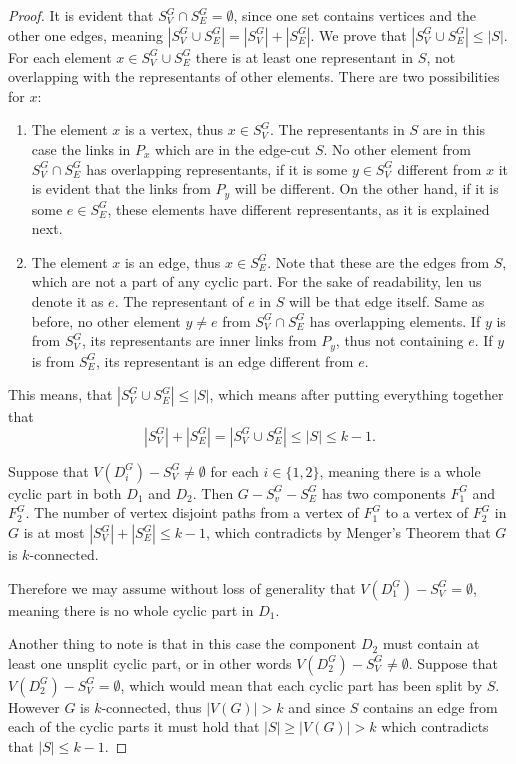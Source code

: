 \documentclass[12pt, twoside]{book}
\begin{document}
\begin{proof}
	It is evident that $S_V^G\cap S_E^G=\emptyset$, since one set contains vertices and the other one edges, meaning $|S_V^G\cup S_E^G|=|S_V^G|+|S_E^G|$. We prove that $|S_V^G\cup S_E^G|\leq |S|$. For each element $x\in S_V^G\cup S_E^G$ there is at least one representant in $S$, not overlapping with the representants of other elements. There are two possibilities for $x$:
	\begin{enumerate}
		\item The element $x$ is a vertex, thus $x\in S_V^G$. The representants in $S$ are in this case the links in $P_x$ which are in the edge-cut $S$. No other element from $S_V^G\cap S_E^G$ has overlapping representants, if it is some $y\in S_V^G$ different from $x$ it is evident that the links from $P_y$ will be different. On the other hand, if it is some $e\in S_E^G$, these elements have different representants, as it is explained next.
		\item The element $x$ is an edge, thus $x\in S_E^G$. Note that these are the edges from $S$, which are not a part of any cyclic part. For the sake of readability, len us denote it as $e$. The representant of $e$ in $S$ will be that edge itself. Same as before, no other element $y\neq e$ from $S_V^G\cap S_E^G$ has overlapping elements. If $y$ is from $S_V^G$, its representants are inner links from $P_y$, thus not containing $e$. If $y$ is from $S_E^G$, its representant is an edge different from $e$.
	\end{enumerate} 
	
	This means, that $|S_V^G\cup S_E^G|\leq |S|$, which means after putting everything together that $$|S_V^G|+|S_E^G|=|S_V^G\cup S_E^G|\leq |S|\leq k-1.$$
	
	Suppose that $V(D_i^G)-S_V^G\neq\emptyset$ for each $i\in \{1,2\}$, meaning there is a whole cyclic part in both $D_1$ and $D_2$. Then $G-S_v^G-S_E^G$ has two components $F_1^G$ and $F_2^G$. The number of vertex disjoint paths from a vertex of $F_1^G$ to a vertex of $F_2^G$ in $G$ is at most $|S_V^G|+|S_E^G|\leq k-1$, which contradicts by Menger's Theorem that $G$ is $k$-connected.
	
	Therefore we may assume without loss of generality that $V(D_1^G)-S_V^G=\emptyset$, meaning there is no whole cyclic part in $D_1$.
	
	Another thing to note is that in this case the component $D_2$ must contain at least one unsplit cyclic part, or in other words $V(D_2^G)-S_V^G\neq\emptyset$. Suppose that $V(D_2^G)-S_V^G=\emptyset$, which would mean that each cyclic part has been split by $S$. However $G$ is $k$-connected, thus $|V(G)|>k$ and since $S$ contains an edge from each of the cyclic parts it must hold that $|S|\geq |V(G)|>k$ which contradicts that $|S|\leq k-1$.
	

\end{proof}
\end{document}
